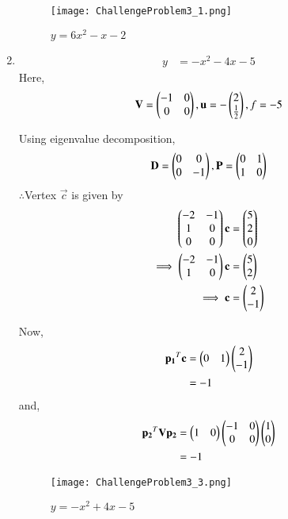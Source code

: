 \documentclass[journal,12pt,twocolumn]{IEEEtran}
\begin{document}
\begin{enumerate}
    \begin{figure}[!ht]
    \centering
    \texttt{[image: ChallengeProblem3\_1.png]}
    \caption{$y=6x^2-x-2$}
    \label{ex2}	
    \end{figure}
    
    \item
    \begin{align}
        y &= -x^2-4x-5
    \end{align}
    Here,
    \begin{align}
        \mathbf{V} = \begin{pmatrix}-1 & 0 \\ 0 & 0\end{pmatrix},\mathbf{u}=-\begin{pmatrix}2 \\ \frac{1}{2}\end{pmatrix},f=-5
    \end{align}
    
    Using eigenvalue decomposition,
    \begin{align}
        \mathbf{D} = \begin{pmatrix}0 & 0\\0 & -1\end{pmatrix} ,\mathbf{P}=\begin{pmatrix}0 & 1\\1 & 0\end{pmatrix}
    \end{align}
    $\therefore$Vertex $\vec{c}$ is given by
    \begin{align}
        \begin{pmatrix}-2 & -1 \\ 1 & 0 \\ 0 & 0\end{pmatrix}\mathbf{c} &= \begin{pmatrix}5 \\ 2 \\ 0\end{pmatrix} \\
        \implies  \begin{pmatrix}-2 & -1 \\ 1 & 0\end{pmatrix}\mathbf{c} &= \begin{pmatrix}5 \\ 2\end{pmatrix}
        \\
        \implies \mathbf{c} &= \begin{pmatrix}2\\-1\end{pmatrix}
    \end{align}
    
    Now,
    \begin{align}
        \mathbf{p_1}^T\mathbf{c} &= \begin{pmatrix}0 & 1\end{pmatrix}\begin{pmatrix}2 \\ -1\end{pmatrix}
        \\
        &= -1
    \end{align}
    and,
    \begin{align}
        \mathbf{p_2}^T\mathbf{V}\mathbf{p_2} &= \begin{pmatrix}1 & 0\end{pmatrix}\begin{pmatrix}-1 & 0\\0& 0\end{pmatrix}\begin{pmatrix}1 \\ 0\end{pmatrix}
        \\
        &= -1
    \end{align}
    
    \begin{figure}[!ht]
    \centering
    \texttt{[image: ChallengeProblem3\_3.png]}
    \caption{$y=-x^2+4x-5$}
    \label{ex4}	
    \end{figure}
    

\end{enumerate}
\end{document}
